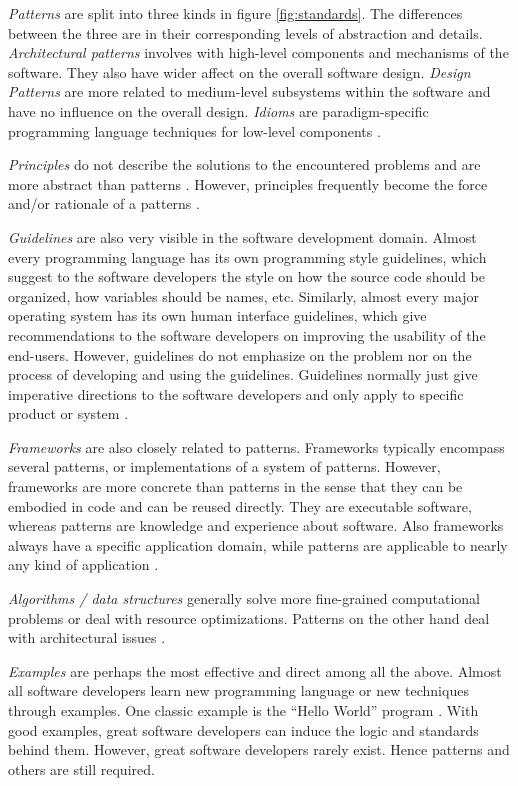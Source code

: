 \documentclass[a4paper,titlepage]{article}
\begin{document}
\textit{Patterns} are split into three kinds in figure
\ref{fig:standards}. The differences between the three are in their
corresponding levels of abstraction and details. \textit{Architectural
  patterns} involves with high-level components and mechanisms of the
software. They also have wider affect on the overall software
design. \textit{Design Patterns} are more related to medium-level
subsystems within the software and have no influence on the overall
design. \textit{Idioms} are paradigm-specific programming language
techniques for low-level components \citep{patterns:buschmann}.

\textit{Principles} do not describe the solutions to the encountered
problems and are more abstract than patterns
\citep{patterns:coplien}. However, principles frequently become the
force and/or rationale of a patterns \citep{patterns:appleton}.

\textit{Guidelines} are also very visible in the software development
domain. Almost every programming language has its own programming
style guidelines, which suggest to the software developers the style
on how the source code should be organized, how variables should be
names, etc. Similarly, almost every major operating system has its own
human interface guidelines, which give recommendations to the software
developers on improving the usability of the end-users. However,
guidelines do not emphasize on the problem nor on the process of
developing and using the guidelines. Guidelines normally just give
imperative directions to the software developers and only apply to
specific product or system \citep{patterns:griffiths}.

\textit{Frameworks} are also closely related to patterns. Frameworks
typically encompass several patterns, or implementations of a system
of patterns. However, frameworks are more concrete than patterns in
the sense that they can be embodied in code and can be reused
directly. They are executable software, whereas patterns are knowledge
and experience about software. Also frameworks always have a specific
application domain, while patterns are applicable to nearly any kind
of application \citep{patterns:gamma}.

\textit{Algorithms / data structures} generally solve more
fine-grained computational problems or deal with resource
optimizations. Patterns on the other hand deal with architectural
issues \citep{patterns:appleton}.

\textit{Examples} are perhaps the most effective and direct among all
the above. Almost all software developers learn new programming
language or new techniques through examples. One classic example is
the ``Hello World'' program \citep{c:kernighan}. With good examples,
great software developers can induce the logic and standards behind
them. However, great software developers rarely exist. Hence patterns
and others are still required.
\end{document}
